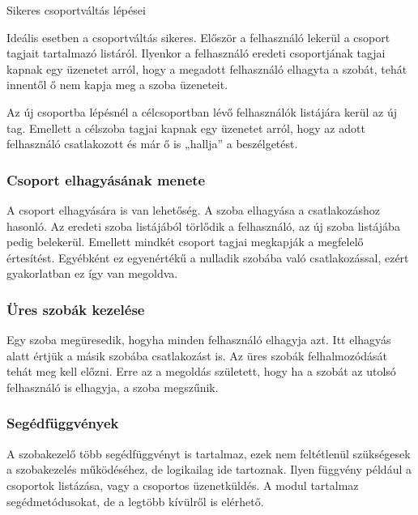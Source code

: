 \documentclass[]{article}
\begin{document}
Sikeres csoportváltás lépései

Ideális esetben a csoportváltás sikeres. Először a felhasználó lekerül a
csoport tagjait tartalmazó listáról. Ilyenkor a felhasználó eredeti
csoportjának tagjai kapnak egy üzenetet arról, hogy a megadott
felhasználó elhagyta a szobát, tehát innentől ő nem kapja meg a szoba
üzeneteit.

Az új csoportba lépésnél a célcsoportban lévő felhasználók listájára
kerül az új tag. Emellett a célszoba tagjai kapnak egy üzenetet arról,
hogy az adott felhasználó csatlakozott és már ő is „hallja'' a
beszélgetést.

\hypertarget{csoport-elhagyuxe1suxe1nak-menete}{%
\subsubsection{Csoport elhagyásának
menete}\label{csoport-elhagyuxe1suxe1nak-menete}}

A csoport elhagyására is van lehetőség. A szoba elhagyása a
csatlakozáshoz hasonló. Az eredeti szoba listájából törlődik a
felhasználó, az új szoba listájába pedig belekerül. Emellett mindkét
csoport tagjai megkapják a megfelelő értesítést. Egyébként ez
egyenértékű a nulladik szobába való csatlakozással, ezért gyakorlatban
ez így van megoldva.

\hypertarget{uxfcres-szobuxe1k-kezeluxe9se}{%
\subsubsection{Üres szobák
kezelése}\label{uxfcres-szobuxe1k-kezeluxe9se}}

Egy szoba megüresedik, hogyha minden felhasználó elhagyja azt. Itt
elhagyás alatt értjük a másik szobába csatlakozást is. Az üres szobák
felhalmozódását tehát meg kell előzni. Erre az a megoldás született,
hogy ha a szobát az utolsó felhasználó is elhagyja, a szoba megszűnik.

\hypertarget{seguxe9dfuxfcggvuxe9nyek}{%
\subsubsection{Segédfüggvények}\label{seguxe9dfuxfcggvuxe9nyek}}

A szobakezelő több segédfüggvényt is tartalmaz, ezek nem feltétlenül
szükségesek a szobakezelés működéséhez, de logikailag ide tartoznak.
Ilyen függvény például a csoportok listázása, vagy a csoportos
üzenetküldés. A modul tartalmaz segédmetódusokat, de a legtöbb kívülről
is elérhető.
\end{document}
